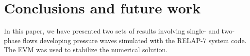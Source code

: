 \documentclass{inputs/mc2015}
\begin{document}
%
\section{Conclusions and future work}\label{sec:conclusion}
%
In this paper, we have presented two sets of results involving single- and two-phase flows developing pressure waves simulated with the RELAP-7 system code. The EVM was used to stabilize the numerical solution.
\end{document}
